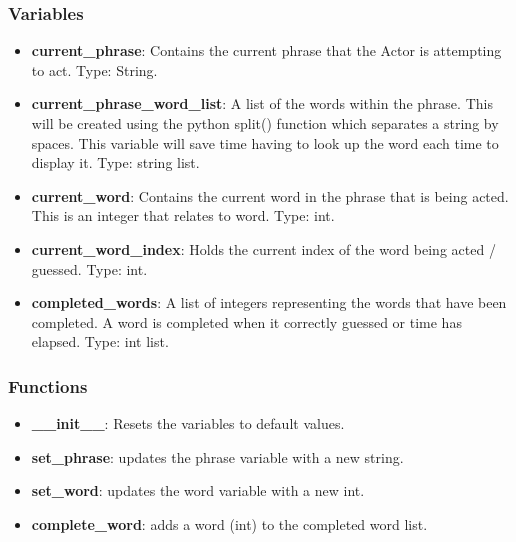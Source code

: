 \documentclass{article}
\begin{document}
\subsubsection{Variables}
\begin{itemize}

	\item \textbf{current\_phrase}: Contains the current phrase that the Actor is attempting to act. Type: String.
	
	\item \textbf{current\_phrase\_word\_list}: A list of the words within the phrase. This will be created using the python split() function which separates a string by spaces. This variable will save time having to look up the word each time to display it. Type: string list.

	\item \textbf{current\_word}: Contains the current word in the phrase that is being acted. This is an integer that relates to word. Type: int.
	
	\item \textbf{current\_word\_index}: Holds the current index of the word being acted / guessed. Type: int.
	
	\item \textbf{completed\_words}: A list of integers representing the words that have been completed. A word is completed when it correctly guessed or time has elapsed. Type: int list.
	
\end{itemize}

\subsubsection{Functions}

\begin{itemize}

	\item \textbf{\_\_init\_\_}: Resets the variables to default values.

	\item \textbf{set\_phrase}: updates the phrase variable with a new string.
	
	\item \textbf{set\_word}: updates the word variable with a  new int.
	
	\item \textbf{complete\_word}: adds a word (int) to the completed word list.

\end{itemize}
\end{document}
